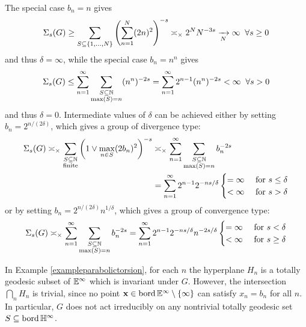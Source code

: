 \begin{example}
\begin{align*}
\end{align*}
The special case $b_n = n$ gives
\[
\Sigma_s(G) \geq \sum_{S\subseteq \{1,\ldots,N\}} \left(\sum_{n = 1}^N (2n)^2\right)^{-s} \asymp_\times 2^N N^{-3s} \xrightarrow[N]{} \infty \;\;\forall s \geq 0
\]
and thus $\delta = \infty$, while the special case $b_n = n^n$ gives
\[
\Sigma_s(G) \leq \sum_{n = 1}^\infty \sum_{\substack{S\subset\N \\ \max(S) = n}} (n^n)^{-2s}
= \sum_{n = 1}^\infty 2^{n - 1} (n^n)^{-2s} < \infty \all s > 0
\]
and thus $\delta = 0$. Intermediate values of $\delta$ can be achieved either by setting $b_n = 2^{n/(2\delta)}$, which gives a group of divergence type:
\begin{align*}
\Sigma_s(G)
\asymp_\times \sum_{\substack{S\subset\N \\ \text{finite}}} \left(1\vee \max_{n\in S} (2b_n)^2\right)^{-s}
&\asymp_\times \sum_{n = 1}^\infty \sum_{\substack{S\subset\N \\ \max(S) = n}} b_n^{-2s}\\
&= \sum_{n = 1}^\infty 2^{n - 1} 2^{-ns/\delta}
\begin{cases}
= \infty & \text{ for $s \leq \delta$}\\
< \infty & \text{ for $s > \delta$}
\end{cases}
\end{align*}
or by setting $b_n = 2^{n/(2\delta)} n^{1/\delta}$, which gives a group of convergence type:
\[
\Sigma_s(G)
\asymp_\times \sum_{n = 1}^\infty \sum_{\substack{S\subset\N \\ \max(S) = n}} b_n^{-2s}
= \sum_{n = 1}^\infty 2^{n - 1} 2^{-ns/\delta} n^{-2s/\delta}
\begin{cases}
= \infty & \text{ for $s < \delta$}\\
< \infty & \text{ for $s \geq \delta$}
\end{cases}
\]
\end{example}

\begin{remark}
\label{remarkparabolictorsion}
In Example \ref{exampleparabolictorsion}, for each $n$ the hyperplane $H_n$ is a totally geodesic subset of $\E^\infty$ which is invariant under $G$. However, the intersection $\bigcap_n H_n$ is trivial, since no point $\xx\in\bord \E^\infty\butnot\{\infty\}$ can satisfy $x_n = b_n$ for all $n$. In particular, $G$ does not act irreducibly on any nontrivial totally geodesic set $S\subset \bord\H^\infty$.
\end{remark}

